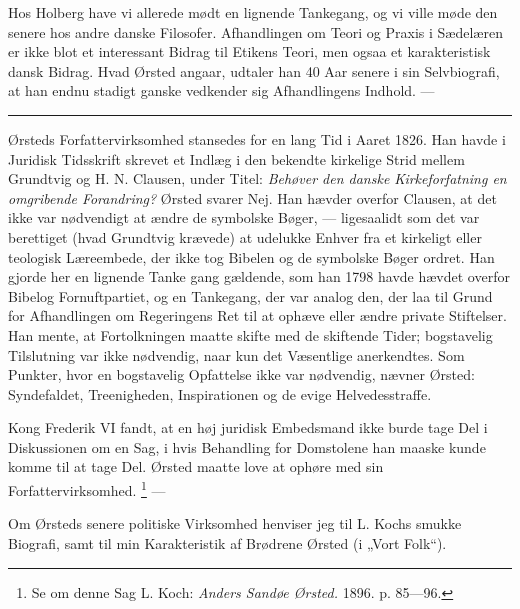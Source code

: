 \documentclass[12pt,a4paper,openany]{book}
\newcommand{\opage}[1]{\marginnote{\footnotesize\textit{[#1]}}}
\begin{document}
Hos Holberg have vi allerede mødt en lignende Tankegang, og vi ville møde den
senere hos andre danske Filosofer. Afhandlingen om Teori og Praxis i Sædelæren
er ikke blot et interessant Bidrag til Etikens Teori, men ogsaa et
karakteristisk dansk Bidrag. Hvad Ørsted angaar, udtaler han 40 Aar senere i
sin Selvbiografi, at han endnu stadigt ganske vedkender sig Afhandlingens
Indhold. ---

\begin{center}\rule{2cm}{0.4pt}\end{center}

Ørsteds Forfattervirksomhed stansedes for en lang Tid i Aaret 1826. Han havde i
Juridisk Tidsskrift skrevet et Indlæg i den bekendte kirkelige Strid mellem
Grundtvig og H. N. Clausen, under Titel: \textit{Behøver den danske
Kirkeforfatning en omgribende Forandring?} Ørsted svarer Nej. Han hævder
overfor Clausen, at det ikke var nødvendigt at ændre de symbolske Bøger, ---
ligesaalidt som det var berettiget (hvad Grundtvig krævede) at udelukke Enhver
fra et kirkeligt eller teologisk Læreembede, der ikke tog Bibelen og de
symbolske Bøger ordret. Han gjorde her en lignende Tanke%
\setcounter{footnote}{0}%
\opage{80}gang gældende, som han 1798 havde hævdet overfor Bibelog
Fornuftpartiet, og en Tankegang, der var analog den, der laa til Grund for
Afhandlingen om Regeringens Ret til at ophæve eller ændre private Stiftelser.
Han mente, at Fortolkningen maatte skifte med de skiftende Tider; bogstavelig
Tilslutning var ikke nødvendig, naar kun det Væsentlige anerkendtes. Som
Punkter, hvor en bogstavelig Opfattelse ikke var nødvendig, nævner Ørsted:
Syndefaldet, Treenigheden, Inspirationen og de evige Helvedesstraffe.

Kong Frederik VI fandt, at en høj juridisk Embedsmand ikke burde tage Del i
Diskussionen om en Sag, i hvis Behandling for Domstolene han maaske kunde komme
til at tage Del. Ørsted maatte love at ophøre med sin Forfattervirksomhed.%
\footnote[1]{Se om denne Sag L. Koch: \textit{Anders Sandøe Ørsted.} 1896. p.
85---96.} ---

Om Ørsteds senere politiske Virksomhed henviser jeg til L. Kochs smukke
Biografi, samt til min Karakteristik af Brødrene Ørsted (i „Vort Folk“).
\end{document}
